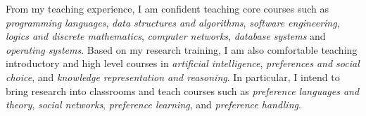 \documentclass[12pt]{article}
\newcommand{\tit}[1]{\textit{#1}}
\begin{document}
From my teaching experience, I am confident teaching core courses such as
\tit{programming languages}, \tit{data structures and algorithms}, \tit{software engineering},
\tit{logics and discrete mathematics},
\tit{computer networks}, \tit{database systems} and \tit{operating systems}.
Based on my research training, I am also comfortable teaching introductory and high 
level courses in \tit{artificial intelligence},
\tit{preferences and social choice}, and \tit{knowledge representation and reasoning}.
In particular, I intend to bring research into classrooms and teach courses such as
\tit{preference languages and theory}, \tit{social networks},
\tit{preference learning}, and \tit{preference handling}.
\end{document}
